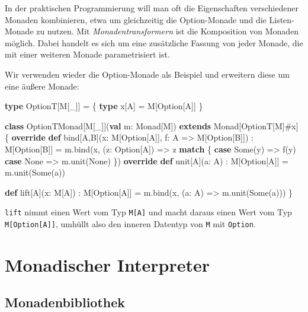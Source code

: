 \documentclass[]{article}
\newenvironment{Shaded}{}{}
\newcommand{\DataTypeTok}[1]{\textcolor[rgb]{0.56,0.13,0.00}{#1}}
\newcommand{\FunctionTok}[1]{\textcolor[rgb]{0.02,0.16,0.49}{#1}}
\newcommand{\KeywordTok}[1]{\textcolor[rgb]{0.00,0.44,0.13}{\textbf{#1}}}
\newcommand{\NormalTok}[1]{#1}
\begin{document}
In der praktischen Programmierung will man oft die Eigenschaften
verschiedener Monaden kombinieren, etwa um gleichzeitig die
Option-Monade und die Listen-Monade zu nutzen. Mit
\emph{Monadentransformern} ist die Komposition von Monaden möglich.
Dabei handelt es sich um eine zusätzliche Fassung von jeder Monade, die
mit einer weiteren Monade parametrisiert ist.

Wir verwenden wieder die Option-Monade als Beispiel und erweitern diese
um eine äußere Monade:

\begin{Shaded}
\begin{Highlighting}[]
\KeywordTok{type}\NormalTok{ OptionT[M[\_]] = \{ }\KeywordTok{type}\NormalTok{ x[A] = M[Option[A]] \}}

\KeywordTok{class}\NormalTok{ OptionTMonad[M[\_]](}\KeywordTok{val}\NormalTok{ m: Monad[M]) }\KeywordTok{extends}\NormalTok{ Monad[OptionT[M]\#x] \{}
  \KeywordTok{override} \KeywordTok{def}\NormalTok{ bind[A,B](x: M[Option[A]], f: A =\textgreater{} M[Option[B]]) : M[Option[B]] =}
\NormalTok{    m.}\FunctionTok{bind}\NormalTok{(x, (z: Option[A]) =\textgreater{} z }\KeywordTok{match}\NormalTok{ \{}
      \KeywordTok{case}\NormalTok{ Some(y) =\textgreater{} }\FunctionTok{f}\NormalTok{(y)}
      \KeywordTok{case}\NormalTok{ None =\textgreater{} m.}\FunctionTok{unit}\NormalTok{(None)}
\NormalTok{    \})}
  \KeywordTok{override} \KeywordTok{def} \DataTypeTok{unit}\NormalTok{[A](a: A) : M[Option[A]] = m.}\FunctionTok{unit}\NormalTok{(Some(a))}
  
  \KeywordTok{def}\NormalTok{ lift[A](x: M[A]) : M[Option[A]] = m.}\FunctionTok{bind}\NormalTok{(x, (a: A) =\textgreater{} m.}\FunctionTok{unit}\NormalTok{(Some(a)))}
\NormalTok{\}}
\end{Highlighting}
\end{Shaded}

\texttt{lift} nimmt einen Wert vom Typ \texttt{M{[}A{]}} und macht
daraus einen Wert vom Typ \texttt{M{[}Option{[}A{]}{]}}, umhüllt also
den inneren Datentyp von \texttt{M} mit \texttt{Option}.

\hypertarget{monadischer-interpreter}{%
\section{Monadischer Interpreter}\label{monadischer-interpreter}}

\hypertarget{monadenbibliothek}{%
\subsection{Monadenbibliothek}\label{monadenbibliothek}}
\end{document}
